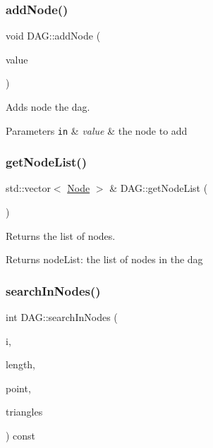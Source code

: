 \subsubsection{\texorpdfstring{add\+Node()}{addNode()}\hspace{0.1cm}{\footnotesize\ttfamily [3/3]}}
{\footnotesize\ttfamily void D\+A\+G\+::add\+Node (\begin{DoxyParamCaption}\item[{const \hyperlink{classNode}{Node} \&}]{value }\end{DoxyParamCaption})}



Adds node the dag. 


\begin{DoxyParams}[1]{Parameters}
\mbox{\tt in}  & {\em value} & the node to add \\
\hline
\end{DoxyParams}
\mbox{\label{classDAG_af8afaefe800c1eb05ef631e148692c2d}} 
\subsubsection{\texorpdfstring{get\+Node\+List()}{getNodeList()}}
{\footnotesize\ttfamily std\+::vector$<$ \hyperlink{classNode}{Node} $>$ \& D\+A\+G\+::get\+Node\+List (\begin{DoxyParamCaption}{ }\end{DoxyParamCaption})}



Returns the list of nodes. 

\begin{DoxyReturn}{Returns}
node\+List\+: the list of nodes in the dag 
\end{DoxyReturn}
\mbox{\label{classDAG_a871ac0ced57e773b7bc8add0268159ec}} 
\subsubsection{\texorpdfstring{search\+In\+Nodes()}{searchInNodes()}}
{\footnotesize\ttfamily int D\+A\+G\+::search\+In\+Nodes (\begin{DoxyParamCaption}\item[{const unsigned int}]{i,  }\item[{const unsigned int}]{length,  }\item[{const cg3\+::\+Point2\+Dd \&}]{point,  }\item[{const std\+::vector$<$ \hyperlink{classTriangle}{Triangle} $>$ \&}]{triangles }\end{DoxyParamCaption}) const}




